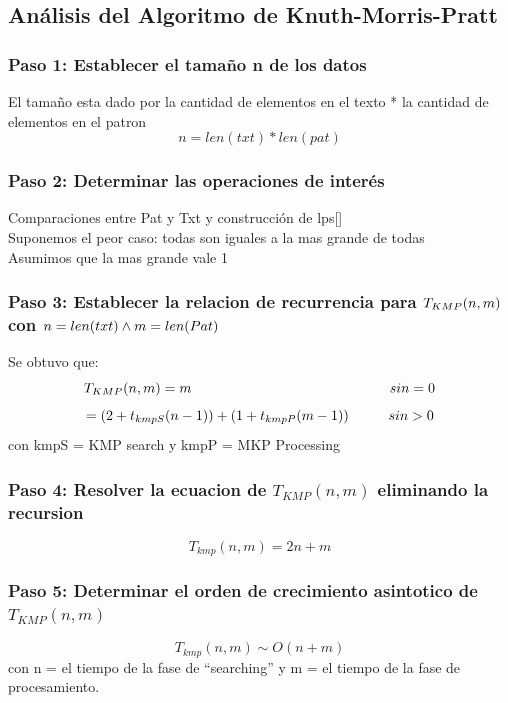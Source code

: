 \subsection*{Análisis del Algoritmo de Knuth-Morris-Pratt}
\subsubsection*{Paso 1: Establecer el tamaño n de los datos}
El tamaño esta dado por la cantidad de elementos en el texto * la cantidad de elementos en el patron
\[n = len(txt) * len(pat)\]


\subsubsection*{Paso 2: Determinar las operaciones de interés}
Comparaciones entre Pat y Txt y construcción de lps[] \\
    Suponemos el peor caso: todas son iguales a la mas grande de todas \\
    Asumimos que la mas grande vale 1 \\


\subsubsection*{Paso 3: Establecer la relacion de recurrencia para $\space T_{KMP}(n, m)$ con $\space n = len(txt) \land m = len(Pat)$}
Se obtuvo que: \[T_{KMP}(n, m) = m \hskip5cm                                   si n = 0\]
\[= (2 + t_{kmpS}(n-1)) + (1 + t_{kmpP}(m-1))\hskip1cm si n > 0\]
con kmpS = KMP search y kmpP = MKP Processing


\subsubsection*{Paso 4: Resolver la ecuacion de $T_{KMP}(n, m)$ eliminando la recursion}
\[T_{kmp}(n, m) = 2n + m\]

\subsubsection*{Paso 5: Determinar el orden de crecimiento asintotico de $T_{KMP}(n, m)$}
    \[T_{kmp}(n, m) \sim O(n + m)\]
    con n = el tiempo de la fase de “searching” y m = el tiempo de la fase de procesamiento.
